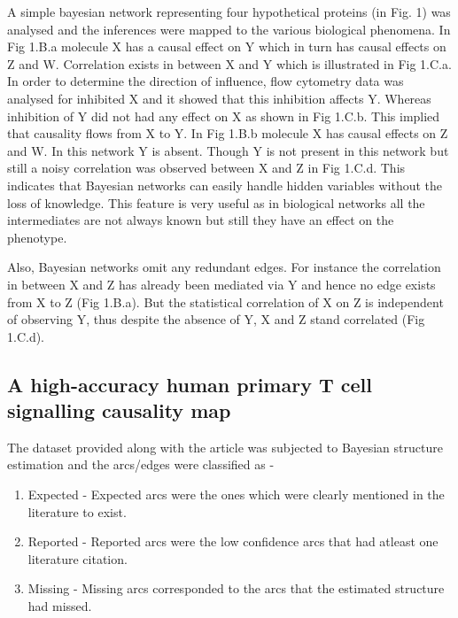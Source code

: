 \documentclass[conference]{IEEEtran}
\begin{document}
A simple bayesian network representing four hypothetical proteins (in Fig. 1) was analysed and the inferences were mapped to the various biological phenomena. In Fig 1.B.a molecule X has a causal effect on Y which in turn has causal effects on Z and W. Correlation exists in between X and Y which is illustrated in Fig 1.C.a. In order to determine the direction of influence, flow cytometry data was analysed for inhibited X and it showed that this inhibition affects Y. Whereas inhibition of Y did not had any effect on X as shown in Fig 1.C.b. This implied that causality flows from X to Y. In Fig 1.B.b molecule X has causal effects on Z and W. In this network Y is absent. Though Y is not present in this network but still a noisy correlation was observed between X and Z in Fig 1.C.d. This indicates that Bayesian networks can easily handle hidden variables without the loss of knowledge. This feature is very useful as in biological networks all the intermediates are not always known but still they have an effect on the phenotype.
\par
Also, Bayesian networks omit any redundant edges. For instance the correlation in between X and Z has already been mediated via Y and hence no edge exists from X to Z (Fig 1.B.a). But the statistical correlation of X on Z is independent of observing Y, thus despite the absence of Y, X and Z stand correlated (Fig 1.C.d).

\subsection{A high-accuracy human primary T cell signalling causality map}
The dataset provided along with the article was subjected to Bayesian structure estimation and the arcs/edges were classified as -
\begin{enumerate}
    \item Expected -
    Expected arcs were the ones which were clearly mentioned in the literature to exist. 
    \item Reported -
    Reported arcs were the low confidence arcs that had atleast one literature citation. 
    \item Missing -
    Missing arcs corresponded to the arcs that the estimated structure had missed.
\end{enumerate}
\end{document}
